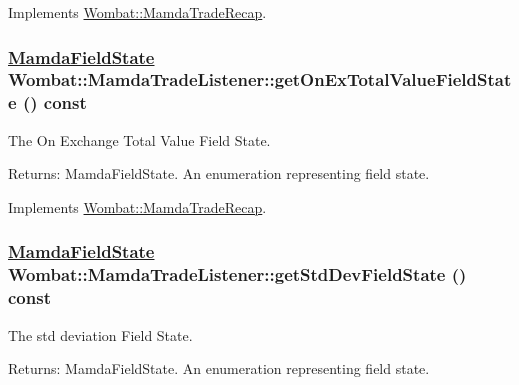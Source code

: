 Implements \hyperlink{classWombat_1_1MamdaTradeRecap_6db0ccb47fa8aac3e063a1833d9e0208}{Wombat::Mamda\-Trade\-Recap}.\hypertarget{classWombat_1_1MamdaTradeListener_63ff116bb1922942926fedde13e4c2f4}{
\subsubsection[getOnExTotalValueFieldState]{\setlength{\rightskip}{0pt plus 5cm}\hyperlink{namespaceWombat_93aac974f2ab713554fd12a1fa3b7d2a}{Mamda\-Field\-State} Wombat::Mamda\-Trade\-Listener::get\-On\-Ex\-Total\-Value\-Field\-State () const}}
\label{classWombat_1_1MamdaTradeListener_63ff116bb1922942926fedde13e4c2f4}


The On Exchange Total Value Field State. 

\begin{Desc}
\item[Returns:]Mamda\-Field\-State. An enumeration representing field state. \end{Desc}


Implements \hyperlink{classWombat_1_1MamdaTradeRecap_bd3a92c7aa26621a03cd80ef45f37f12}{Wombat::Mamda\-Trade\-Recap}.\hypertarget{classWombat_1_1MamdaTradeListener_dccc4da383c8a20f86ce59d774e55778}{
\subsubsection[getStdDevFieldState]{\setlength{\rightskip}{0pt plus 5cm}\hyperlink{namespaceWombat_93aac974f2ab713554fd12a1fa3b7d2a}{Mamda\-Field\-State} Wombat::Mamda\-Trade\-Listener::get\-Std\-Dev\-Field\-State () const}}
\label{classWombat_1_1MamdaTradeListener_dccc4da383c8a20f86ce59d774e55778}


The std deviation Field State. 

\begin{Desc}
\item[Returns:]Mamda\-Field\-State. An enumeration representing field state. \end{Desc}



